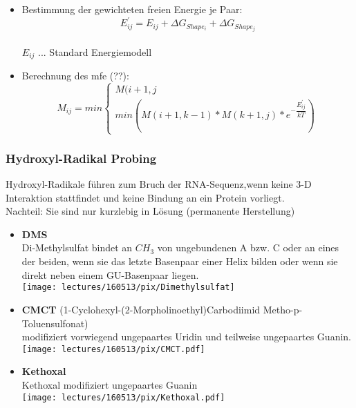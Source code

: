 \begin{itemize}
\item Bestimmung der gewichteten freien Energie je Paar: \\
\begin{equation}
E^{'}_{ij} = E_{ij} + \Delta G_{Shape_i} + \Delta G_{Shape_j}
\end{equation} \\
$E_{ij}$ ... Standard Energiemodell

\item Berechnung des mfe (??): \\
\begin{equation}
M_{ij} = min
\begin{cases} 
M(i+1,j \\
min (M(i+1,k-1)*M(k+1,j)*e^{-\dfrac{E^{'}_{ij}}{kT}})
\end{cases}
\end{equation}
\end{itemize}

\subsubsection{Hydroxyl-Radikal Probing}
Hydroxyl-Radikale führen zum Bruch der RNA-Sequenz,wenn keine 3-D Interaktion stattfindet und keine Bindung an ein Protein vorliegt.\\
Nachteil: Sie sind nur kurzlebig in Lösung (permanente Herstellung)

\begin{itemize}

\item \textbf{DMS} \\
Di-Methylsulfat bindet an $CH_3$ von ungebundenen A bzw. C oder an eines der beiden, wenn sie das letzte Basenpaar einer Helix bilden oder wenn sie direkt neben einem GU-Basenpaar liegen. \\ \texttt{[image: lectures/160513/pix/Dimethylsulfat]} \\

\item \textbf{CMCT} (1-Cyclohexyl-(2-Morpholinoethyl)Carbodiimid Metho-p-Toluensulfonat)  \\
modifiziert vorwiegend ungepaartes Uridin und teilweise ungepaartes Guanin. \\
\texttt{[image: lectures/160513/pix/CMCT.pdf]} \\

\item \textbf{Kethoxal} \\
Kethoxal modifiziert ungepaartes Guanin \\
\texttt{[image: lectures/160513/pix/Kethoxal.pdf]}
\end{itemize}

